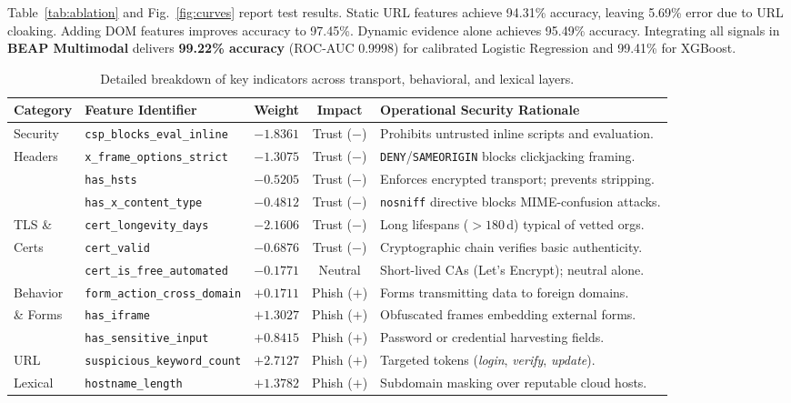 \documentclass{llncs}
\begin{document}
Table~\ref{tab:ablation} and Fig.~\ref{fig:curves} report test results. Static URL features achieve 94.31\% accuracy, leaving 5.69\% error due to URL cloaking. Adding DOM features improves accuracy to 97.45\%. Dynamic evidence alone achieves 95.49\% accuracy. Integrating all signals in \textbf{BEAP Multimodal} delivers \textbf{99.22\% accuracy} (ROC-AUC 0.9998) for calibrated Logistic Regression and 99.41\% for XGBoost.

\begin{table}[t]
\caption{Detailed breakdown of key indicators across transport, behavioral, and lexical layers.}
\label{tab:features}
\centering
\setlength{\tabcolsep}{4pt}
\renewcommand{\arraystretch}{0.92}
\begin{tabular}{llccl}
\toprule
\textbf{Category} & \textbf{Feature Identifier} & \textbf{Weight} & \textbf{Impact} & \textbf{Operational Security Rationale} \\
\midrule
Security & \texttt{csp\_blocks\_eval\_inline} & $-1.8361$ & Trust ($-$) & Prohibits untrusted inline scripts and evaluation. \\
Headers  & \texttt{x\_frame\_options\_strict} & $-1.3075$ & Trust ($-$) & \texttt{DENY}/\texttt{SAMEORIGIN} blocks clickjacking framing. \\
         & \texttt{has\_hsts} & $-0.5205$ & Trust ($-$) & Enforces encrypted transport; prevents stripping. \\
         & \texttt{has\_x\_content\_type} & $-0.4812$ & Trust ($-$) & \texttt{nosniff} directive blocks MIME-confusion attacks. \\
\midrule
TLS \&   & \texttt{cert\_longevity\_days} & $-2.1606$ & Trust ($-$) & Long lifespans ($>180$\,d) typical of vetted orgs. \\
Certs    & \texttt{cert\_valid} & $-0.6876$ & Trust ($-$) & Cryptographic chain verifies basic authenticity. \\
         & \texttt{cert\_is\_free\_automated} & $-0.1771$ & Neutral & Short-lived CAs (Let's Encrypt); neutral alone. \\
\midrule
Behavior & \texttt{form\_action\_cross\_domain}& $+0.1711$ & Phish ($+$) & Forms transmitting data to foreign domains. \\
\& Forms & \texttt{has\_iframe} & $+1.3027$ & Phish ($+$) & Obfuscated frames embedding external forms. \\
         & \texttt{has\_sensitive\_input} & $+0.8415$ & Phish ($+$) & Password or credential harvesting fields. \\
\midrule
URL      & \texttt{suspicious\_keyword\_count}& $+2.7127$ & Phish ($+$) & Targeted tokens (\textit{login}, \textit{verify}, \textit{update}). \\
Lexical  & \texttt{hostname\_length} & $+1.3782$ & Phish ($+$) & Subdomain masking over reputable cloud hosts. \\
\bottomrule
\end{tabular}
\end{table}
\end{document}

